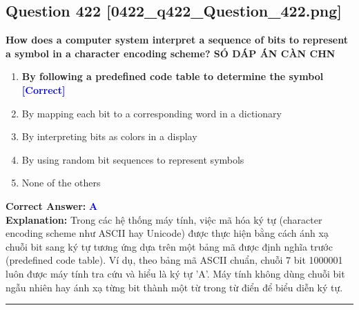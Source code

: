 \documentclass[11pt,a4paper]{article}
\begin{document}
\begin{minipage}{\textwidth}
\subsection*{Question 422 \quad \footnotesize{[0422\_q422\_Question\_422.png]}}
\noindent \textbf{How does a computer system interpret a sequence of bits to represent a symbol in a character encoding scheme? SÓ DÁP ÁN CÀN CHN}

\begin{enumerate}[label=\Alph*.]
    \item \textbf{By following a predefined code table to determine the symbol} \hfill \textcolor{blue}{\textbf{[Correct]}}
    \item By mapping each bit to a corresponding word in a dictionary
    \item By interpreting bits as colors in a display
    \item By using random bit sequences to represent symbols
    \item None of the others
\end{enumerate}

\noindent \textbf{Correct Answer:} \textcolor{blue}{\textbf{A}} \\[2pt]
\noindent \textbf{Explanation:} Trong các hệ thống máy tính, việc mã hóa ký tự (character encoding scheme như ASCII hay Unicode) được thực hiện bằng cách ánh xạ chuỗi bit sang ký tự tương ứng dựa trên một bảng mã được định nghĩa trước (predefined code table). Ví dụ, theo bảng mã ASCII chuẩn, chuỗi 7 bit 1000001 luôn được máy tính tra cứu và hiểu là ký tự 'A'. Máy tính không dùng chuỗi bit ngẫu nhiên hay ánh xạ từng bit thành một từ trong từ điển để biểu diễn ký tự.

\par\vspace{0.3cm}
\hrule
\vspace{0.3cm}
\end{minipage}
\end{document}

